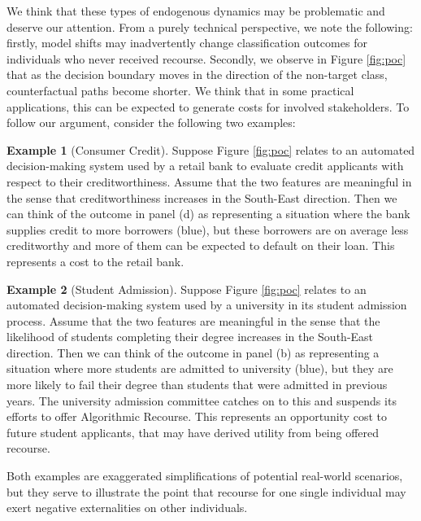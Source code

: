 \documentclass[conference,final,]{IEEEtran}
\theoremstyle{definition}
\theoremstyle{definition}
\newtheorem{example}{Example}[section]
\theoremstyle{definition}
\theoremstyle{definition}
\theoremstyle{remark}
\begin{document}
We think that these types of endogenous dynamics may be problematic and deserve our attention. From a purely technical perspective, we note the following: firstly, model shifts may inadvertently change classification outcomes for individuals who never received recourse. Secondly, we observe in Figure \ref{fig:poc} that as the decision boundary moves in the direction of the non-target class, counterfactual paths become shorter. We think that in some practical applications, this can be expected to generate costs for involved stakeholders. To follow our argument, consider the following two examples:

\begin{example}[Consumer Credit]
\protect\hypertarget{exm:consumer}{}\label{exm:consumer}Suppose Figure \ref{fig:poc} relates to an automated decision-making system used by a retail bank to evaluate credit applicants with respect to their creditworthiness. Assume that the two features are meaningful in the sense that creditworthiness increases in the South-East direction. Then we can think of the outcome in panel (d) as representing a situation where the bank supplies credit to more borrowers (blue), but these borrowers are on average less creditworthy and more of them can be expected to default on their loan. This represents a cost to the retail bank.
\end{example}

\begin{example}[Student Admission]
\protect\hypertarget{exm:student}{}\label{exm:student}Suppose Figure \ref{fig:poc} relates to an automated decision-making system used by a university in its student admission process. Assume that the two features are meaningful in the sense that the likelihood of students completing their degree increases in the South-East direction. Then we can think of the outcome in panel (b) as representing a situation where more students are admitted to university (blue), but they are more likely to fail their degree than students that were admitted in previous years. The university admission committee catches on to this and suspends its efforts to offer Algorithmic Recourse. This represents an opportunity cost to future student applicants, that may have derived utility from being offered recourse.
\end{example}

Both examples are exaggerated simplifications of potential real-world scenarios, but they serve to illustrate the point that recourse for one single individual may exert negative externalities on other individuals.
\end{document}
